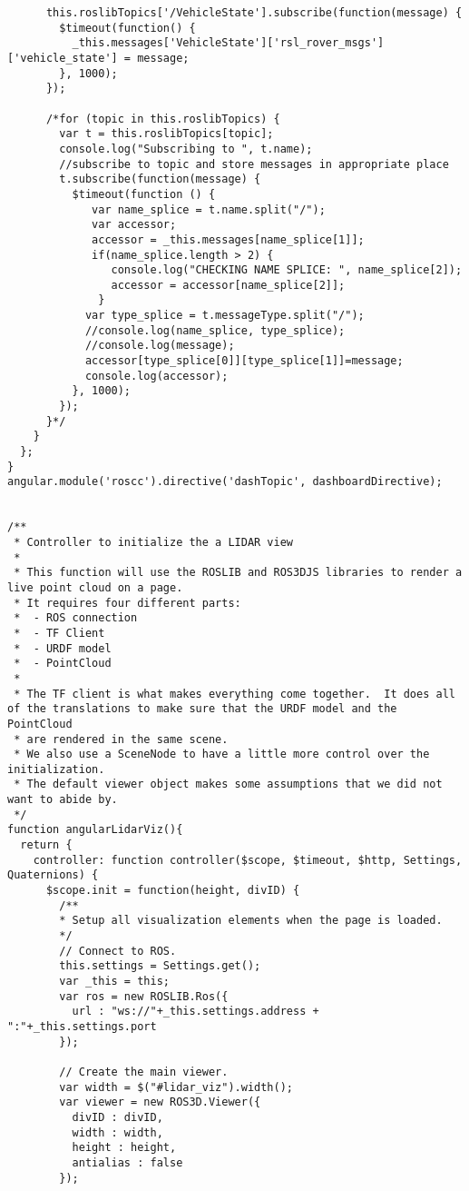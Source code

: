 \begin{verbatim}
      this.roslibTopics['/VehicleState'].subscribe(function(message) {
        $timeout(function() {
          _this.messages['VehicleState']['rsl_rover_msgs']['vehicle_state'] = message;
        }, 1000);
      });

      /*for (topic in this.roslibTopics) {
        var t = this.roslibTopics[topic];
        console.log("Subscribing to ", t.name);
        //subscribe to topic and store messages in appropriate place
        t.subscribe(function(message) {
          $timeout(function () {
             var name_splice = t.name.split("/");
             var accessor;
             accessor = _this.messages[name_splice[1]];
             if(name_splice.length > 2) {
                console.log("CHECKING NAME SPLICE: ", name_splice[2]);
                accessor = accessor[name_splice[2]];
              }
            var type_splice = t.messageType.split("/");
            //console.log(name_splice, type_splice);
            //console.log(message);
            accessor[type_splice[0]][type_splice[1]]=message;
            console.log(accessor);
          }, 1000);
        });
      }*/
    }
  };
}
angular.module('roscc').directive('dashTopic', dashboardDirective);


/**
 * Controller to initialize the a LIDAR view
 *
 * This function will use the ROSLIB and ROS3DJS libraries to render a live point cloud on a page.
 * It requires four different parts:
 *  - ROS connection
 *  - TF Client
 *  - URDF model
 *  - PointCloud
 *
 * The TF client is what makes everything come together.  It does all of the translations to make sure that the URDF model and the PointCloud 
 * are rendered in the same scene.
 * We also use a SceneNode to have a little more control over the initialization.
 * The default viewer object makes some assumptions that we did not want to abide by.
 */
function angularLidarViz(){
  return {
    controller: function controller($scope, $timeout, $http, Settings, Quaternions) {
      $scope.init = function(height, divID) {
        /**
        * Setup all visualization elements when the page is loaded.
        */
        // Connect to ROS.
        this.settings = Settings.get();
        var _this = this;
        var ros = new ROSLIB.Ros({
          url : "ws://"+_this.settings.address + ":"+_this.settings.port
        });

        // Create the main viewer.
        var width = $("#lidar_viz").width();
        var viewer = new ROS3D.Viewer({
          divID : divID,
          width : width,
          height : height,
          antialias : false
        });


\end{verbatim}
